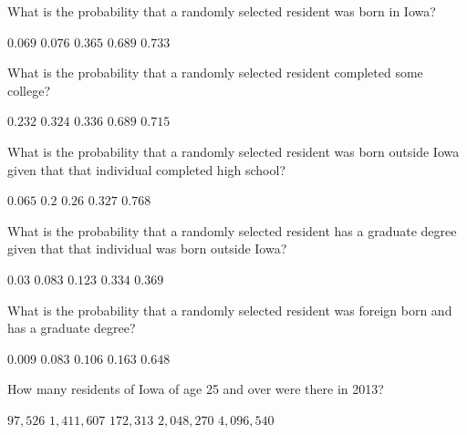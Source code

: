 \documentclass[answers,12pt]{exam}
\begin{document}
\begin{questions}

\question\label{FirstIowa} What is the probability that a randomly selected
resident was born in Iowa?\\
\begin{oneparchoices}
\choice $0.069$ %
\choice $0.076$ %
\choice $0.365$ %
\correctchoice $0.689$
\choice $0.733$ %
\end{oneparchoices}

\question What is the probability that a randomly selected
resident completed some college?\\
\begin{oneparchoices}
\choice $0.232$ %
\correctchoice $0.324$
\choice $0.336$ %
\choice $0.689$ %
\choice $0.715$ %
\end{oneparchoices}

\question What is the probability that a randomly selected
resident was born outside Iowa given that
that individual completed high school?\\
\begin{oneparchoices}
\choice $0.065$ %
\correctchoice $0.2$
\choice $0.26$ %
\choice $0.327$ %
\choice $0.768$ %
\end{oneparchoices}

\question What is the probability that a randomly selected
resident has a graduate degree given that
that individual was born outside Iowa?\\
\begin{oneparchoices}
\choice $0.03$ %
\choice $0.083$ %
\correctchoice $0.123$
\choice $0.334$ %
\choice $0.369$ %
\end{oneparchoices}

\question What is the probability that a randomly selected
resident was foreign born and has a graduate degree?\\
\begin{oneparchoices}
\correctchoice $0.009$
\choice $0.083$ %
\choice $0.106$ %
\choice $0.163$ %
\choice $0.648$ %
\end{oneparchoices}

\question\label{LastIowa} How many residents of Iowa 
of age 25 and over were there in 2013?\\
\begin{oneparchoices}
\choice $97,526$
\choice $1,411,607$
\choice $172,313$
\correctchoice $2,048,270$
\choice $4,096,540$ %
\end{oneparchoices}


\end{questions}
\end{document}
